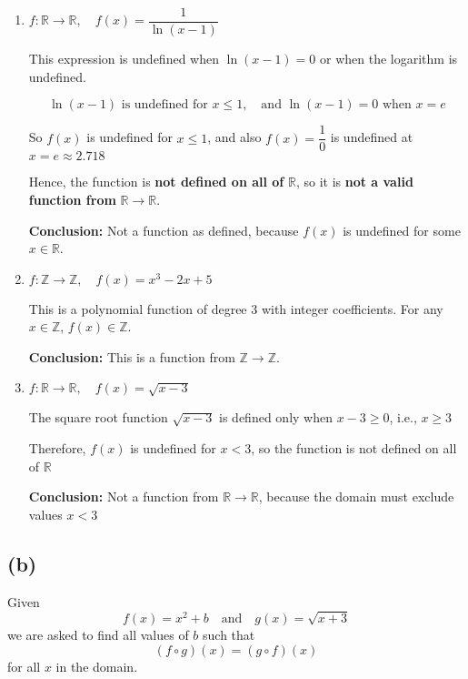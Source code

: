\documentclass{article}
\begin{document}
\begin{enumerate}[label=\roman*.]

\item \( f : \mathbb{R} \to \mathbb{R}, \quad f(x) = \dfrac{1}{\ln(x - 1)} \)

This expression is undefined when \( \ln(x - 1) = 0 \) or when the logarithm is undefined.

\[
\ln(x - 1) \text{ is undefined for } x \leq 1,\quad \text{and } \ln(x - 1) = 0 \text{ when } x = e
\]

So \( f(x) \) is undefined for \( x \leq 1 \), and also \( f(x) = \dfrac{1}{0} \) is undefined at \( x = e \approx 2.718 \)

Hence, the function is \textbf{not defined on all of } \( \mathbb{R} \), so it is \textbf{not a valid function from } \( \mathbb{R} \to \mathbb{R} \).

\textbf{Conclusion:} Not a function as defined, because \( f(x) \) is undefined for some \( x \in \mathbb{R} \).

\item \( f : \mathbb{Z} \to \mathbb{Z}, \quad f(x) = x^3 - 2x + 5 \)

This is a polynomial function of degree 3 with integer coefficients.  
For any \( x \in \mathbb{Z} \), \( f(x) \in \mathbb{Z} \).

\textbf{Conclusion:} This is a function from \( \mathbb{Z} \to \mathbb{Z} \).

\item \( f : \mathbb{R} \to \mathbb{R}, \quad f(x) = \sqrt{x - 3} \)

The square root function \( \sqrt{x - 3} \) is defined only when \( x - 3 \geq 0 \), i.e., \( x \geq 3 \)

Therefore, \( f(x) \) is undefined for \( x < 3 \), so the function is not defined on all of \( \mathbb{R} \)

\textbf{Conclusion:} Not a function from \( \mathbb{R} \to \mathbb{R} \), because the domain must exclude values \( x < 3 \)

\end{enumerate}

\subsection*{(b)}

Given
\[
f(x) = x^2 + b \quad \text{and} \quad g(x) = \sqrt{x + 3}
\]
we are asked to find all values of \( b \) such that
\[
(f \circ g)(x) = (g \circ f)(x)
\]
for all \( x \) in the domain.
\end{document}
